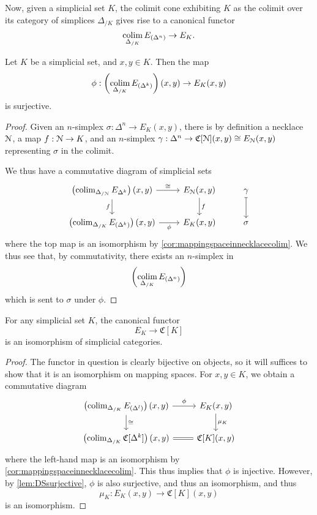Now, given a simplicial set $K$, the colimit cone exhibiting $K$ as the colimit over its category of simplices $\Delta_{/K}$ gives rise to a canonical functor 
\[
\operatorname*{colim}_{\Delta_{/K}} E_{(\Delta^n)}\to E_{K}.
\]

\begin{lemma}\label{lem:DSsurjective}
	Let $K$ be a simplicial set, and $x,y\in K$. Then the map
	\[
	\phi:\left(\operatorname*{colim}_{\Delta_{/K}} E_{(\Delta^k)}\right)(x,y)\to E_{K}(x,y)
	\]
	is surjective.
\end{lemma}

\begin{proof}
	Given an $n$-simplex $\sigma:\Delta^n\to E_K(x,y)$, there is by definition a necklace $\EuScript{N}$, a map $f:\EuScript{N}\to K$, and an $n$-simplex $\gamma:\Delta^n \to \mathfrak{C}[\EuScript{N}](x,y)\cong E_{\EuScript{N}}(x,y)$ representing $\sigma$ in the colimit. 
	
	We thus have a commutative diagram of simplicial sets
	\[
	\begin{tikzcd}
		\left(\colim_{\Delta_{/\EuScript{N}}} E_{\Delta^k}\right)(x,y)\arrow[r,"\cong"]\arrow[d,"f"'] & E_{\EuScript{N}}(x,y)\arrow[d,"f"] & \gamma\arrow[d,mapsto] \\
		\left(\colim_{\Delta_{/K}} E_{(\Delta^k)}\right)(x,y)\arrow[r,"\phi"'] & E_K(x,y) & \sigma
	\end{tikzcd}
	\]
	where the top map is an isomorphism by \autoref{cor:mappingspaceinnecklacecolim}. We thus see that, by commutativity, there exists an $n$-simplex in 
	\[
		\left(\operatorname*{colim}_{\Delta_{/K}} E_{(\Delta^n)}\right)
	\]
	which is sent to $\sigma$ under $\phi$. 
\end{proof}

\begin{proposition}
	For any simplicial set $K$, the canonical functor 
	\[
	E_K\to \mathfrak{C}[K]
	\]
	is an isomorphism of simplicial categories. 
\end{proposition}

\begin{proof}
	The functor in question is clearly bijective on objects, so it will suffices to show that it is an isomorphism on mapping spaces. For $x,y\in K$, we obtain a commutative diagram 
	\[
	\begin{tikzcd}
	\left(\colim_{\Delta_{/K}} E_{(\Delta^l)}\right)(x,y)\arrow[r,"\phi"]\arrow[d,"\cong"] & E_K(x,y)\arrow[d,"\mu_K"]\\
		\left(\colim_{\Delta_{/K}} \mathfrak{C}[\Delta^k]\right)(x,y)\arrow[r,equal] & \mathfrak{C}[K](x,y)
	\end{tikzcd}
	\] 
	where the left-hand map is an isomorphism by \autoref{cor:mappingspaceinnecklacecolim}. This thus implies that $\phi$ is injective. However, by \autoref{lem:DSsurjective}, $\phi$ is also surjective, and thus an isomorphism, and thus
	\[
	\mu_K:E_K(x,y)\to \mathfrak{C}[K](x,y)
	\]
	is an isomorphism. 
\end{proof}

